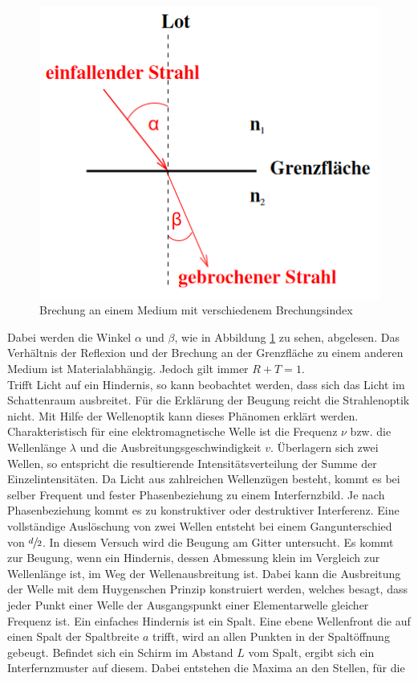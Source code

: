 \begin{figure}
    \centering
    \caption{Brechung an einem Medium mit verschiedenem Brechungsindex \cite{V400}}
    \label{fig:brech}
    \includegraphics[width = 0.6 \textwidth]{pics/brechung.png}
\end{figure}
Dabei werden die Winkel $\alpha$ und $\beta$, wie in Abbildung \ref{fig:brech} zu sehen, abgelesen.
Das Verhältnis der Reflexion und der Brechung an der Grenzfläche zu einem anderen Medium ist Materialabhängig. Jedoch gilt immer $R+T=1$.
\\
Trifft Licht auf ein Hindernis, so kann beobachtet werden, dass sich das Licht im Schattenraum ausbreitet.
Für die Erklärung der Beugung reicht die Strahlenoptik nicht. Mit Hilfe der Wellenoptik kann dieses Phänomen erklärt werden.
Charakteristisch für eine elektromagnetische Welle ist die Frequenz $\nu$ bzw. die Wellenlänge $\lambda$ und die Ausbreitungsgeschwindigkeit $v$.
Überlagern sich zwei Wellen, so entspricht die resultierende Intensitätsverteilung der Summe der Einzelintensitäten. Da Licht aus zahlreichen Wellenzügen besteht, kommt es bei selber Frequent und fester Phasenbeziehung
zu einem Interfernzbild. Je nach Phasenbeziehung kommt es zu konstruktiver oder destruktiver Interferenz. Eine vollständige Auslöschung von zwei Wellen entsteht bei einem Gangunterschied von $\sfrac{d}{2}$.
In diesem Versuch wird die Beugung am Gitter untersucht. Es kommt zur Beugung, wenn ein Hindernis, dessen Abmessung klein im Vergleich zur Wellenlänge ist, im Weg der Wellenausbreitung ist.
Dabei kann die Ausbreitung der Welle mit dem Huygenschen Prinzip konstruiert werden, welches besagt, dass jeder Punkt einer Welle der Ausgangspunkt einer Elementarwelle gleicher Frequenz ist.
Ein einfaches Hindernis ist ein Spalt. Eine ebene Wellenfront die auf einen Spalt der Spaltbreite $a$ trifft, wird an allen Punkten in der Spaltöffnung gebeugt.
Befindet sich ein Schirm im Abstand $L$ vom Spalt, ergibt sich ein Interfernzmuster auf diesem. Dabei entstehen die Maxima an den Stellen, für die
